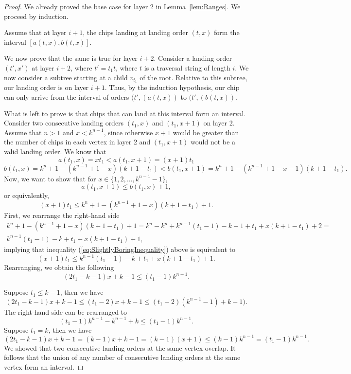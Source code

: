 \documentclass[11pt]{article}
\theoremstyle{definition}
\theoremstyle{remark}
\begin{document}
\begin{proof}
    We already proved the base case for layer 2 in Lemma~\ref{lem:Ranges}. We proceed by induction.
    
    Assume that at layer $i+1$, the chips landing at landing order $(t,x)$ form the interval $[a(t,x), b(t,x)]$.

    We now prove that the same is true for layer $i+2$. Consider a landing order $(t',x')$ at layer $i+2$, where $t'=t_1t$, where $t$ is a traversal string of length $i$. We now consider a subtree starting at a child $v_{t_1}$ of the root. Relative to this subtree, our landing order is on layer $i+1$. Thus, by the induction hypothesis, our chip can only arrive from the interval of orders $(t',(a(t,x))$ to $(t',(b(t,x))$.
    
    What is left to prove is that chips that can land at this interval form an interval. Consider two consecutive landing orders $(t_1,x)$ and $(t_1,x+1)$ on layer 2. Assume that $n > 1$ and $x < k^{n-1}$, since otherwise $x+1$ would be greater than the number of chips in each vertex in layer 2 and $(t_1, x+1)$ would not be a valid landing order.  We know that 
    \[a(t_1,x) = xt_1 < a(t_1,x+1) = (x+1)t_1\]
    \[b(t_1,x) = k^n +1- (k^{n-1} + 1 - x) (k+1-t_1) < b(t_1,x+1) =k^n+1 - (k^{n-1} + 1 - x-1) (k+1-t_1).\]
    Now, we want to show that for $x \in \{1, 2, \dots, k^{n-1}-1\}$,
    \[a(t_1,x+1) \leq b(t_1,x) + 1,\]
    or equivalently,
     \begin{equation}\label{eq:SlightlyBoringInequality}
         (x+1)t_1 \leq k^n +1- (k^{n-1} + 1 - x) (k+1-t_1) + 1.
     \end{equation}
     First, we rearrange the right-hand side
     \begin{multline*}
        k^n +1- (k^{n-1} + 1 - x) (k+1-t_1) + 1 = k^n-k^n + k^{n-1} (t_1-1) -k-1+t_1 +x (k+1-t_1) + 2 = \\
        k^{n-1} (t_1-1) -k+ t_1 +x (k+1-t_1)+1,
     \end{multline*}
     implying that inequality (\ref{eq:SlightlyBoringInequality}) above is equivalent to
     \[(x+1)t_1 \leq k^{n-1} (t_1-1) -k+ t_1 +x (k+1-t_1)+1.\]
     Rearranging, we obtain the following
     \begin{equation}\label{eq:SimplerInequality}
         (2t_1-k-1) x+k-1 \leq (t_1-1) k^{n-1}.
     \end{equation}

     Suppose $t_1 \leq k-1$, then we have
     \[(2t_1-k-1) x+k-1 \leq (t_1-2) x+k-1 \leq (t_1-2)(k^{n-1} -1) + k-1).\]
    The right-hand side can be rearranged to
    \[(t_1 - 1)k^{n-1} - k^{n-1} + k  \leq  (t_1 - 1)k^{n-1}.\]
    Suppose $t_1 = k$, then we have 
     \[(2t_1-k-1) x+k-1 = (k-1) x+k-1 = (k-1)(x+1) \leq (k-1) k^{n-1} = (t_1-1) k^{n-1}.\]
     We showed that two consecutive landing orders at the same vertex overlap. It follows that the union of any number of consecutive landing orders at the same vertex form an interval.
\end{proof}
\end{document}
